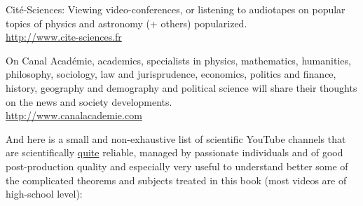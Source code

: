 	\bcdfrance{} Cité-Sciences: Viewing video-conferences, or listening to audiotapes on popular topics of physics and astronomy (+ others) popularized.\\
	\href{http://www.cite-sciences.fr}{\color{blue}http://www.cite-sciences.fr}
	
	\bcdfrance{} On Canal Académie, academics, specialists in physics, mathematics, humanities, philosophy, sociology, law and jurisprudence, economics, politics and finance, history, geography and demography and political science will share their thoughts on the news and society developments.\\
	\href{http://www.canalacademie.com}{\color{blue}http://www.canalacademie.com}
	
	\pagebreak
	And here is a small and non-exhaustive list of scientific YouTube channels that are scientifically \underline{quite} reliable, managed by passionate individuals and of good post-production quality and especially very useful to understand better some of the complicated theorems and subjects treated in this book (most videos are of high-school level):
